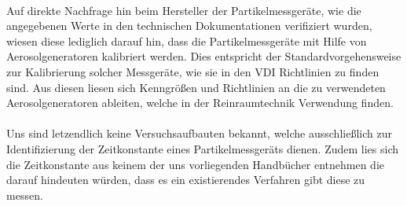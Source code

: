 \\
Auf direkte Nachfrage hin beim Hersteller der Partikelmessger\"{a}te, wie die angegebenen Werte in den technischen Dokumentationen verifiziert wurden, wiesen diese lediglich darauf hin, dass die Partikelmessger\"{a}te mit Hilfe von Aerosolgeneratoren kalibriert werden. Dies entspricht der Standardvorgehensweise zur Kalibrierung solcher Messger\"{a}te, wie sie in den VDI Richtlinien zu finden sind. Aus diesen liesen sich Kenngr\"{o}{\ss}en und Richtlinien an die zu verwendeten Aerosolgeneratoren ableiten, welche in der Reinraumtechnik Verwendung finden.
\\
\\
Uns sind letzendlich keine Versuchsaufbauten bekannt, welche ausschlie{\ss}lich zur Identifizierung der Zeitkonstante eines Partikelmessger\"{a}ts dienen. Zudem lies sich die Zeitkonstante aus keinem der uns vorliegenden Handb\"{u}cher entnehmen die darauf hindeuten w\"{u}rden, dass es ein existierendes Verfahren gibt diese zu messen. 